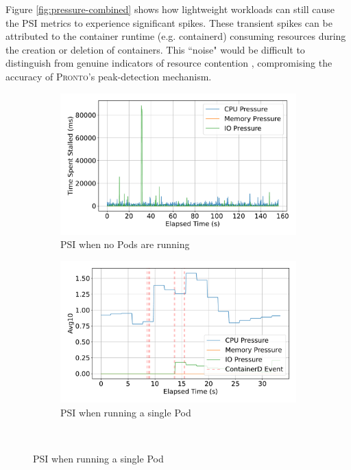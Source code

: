 Figure \ref{fig:pressure-combined} shows how lightweight workloads can still cause the
PSI metrics to experience significant spikes. These transient spikes
can be attributed to the container runtime (e.g. containerd) consuming resources
during the creation or deletion of containers. This ``noise" would be
difficult to distinguish from genuine indicators of resource contention ,
compromising the accuracy of \textsc{Pronto}'s peak-detection mechanism.

\begin{figure}[ht!] %
    \centering %

    \begin{subfigure}[b]{0.48\textwidth} %
        \centering
        \includegraphics[width=\linewidth]{images/pressure-baseline.pdf}
        \caption{PSI when no Pods are running} %
        \label{fig:avg-pressure-baseline} %
    \end{subfigure}%
    \hfill %
    \begin{subfigure}[b]{0.48\textwidth}
        \centering
        \includegraphics[width=\linewidth]{images/avg-pressure-single.pdf}
        \caption{PSI when running a single Pod} %
        \label{fig:avg-pressure-single}
    \end{subfigure}
    \\[1em] %


\end{figure}
